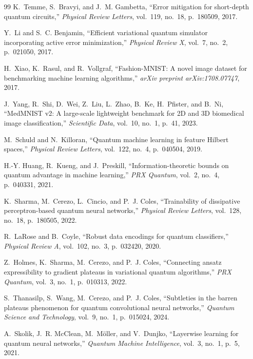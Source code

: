 \documentclass[10pt,twocolumn,twoside,a4paper]{article}
\begin{document}
\begin{thebibliography}{99}
K.~Temme, S.~Bravyi, and J.~M. Gambetta,
``Error mitigation for short-depth quantum circuits,''
\textit{Physical Review Letters}, vol.~119, no.~18, p.~180509, 2017.

Y.~Li and S.~C. Benjamin,
``Efficient variational quantum simulator incorporating active error minimization,''
\textit{Physical Review X}, vol.~7, no.~2, p.~021050, 2017.

H.~Xiao, K.~Rasul, and R.~Vollgraf,
``Fashion-MNIST: A novel image dataset for benchmarking machine learning algorithms,''
\textit{arXiv preprint arXiv:1708.07747}, 2017.

J.~Yang, R.~Shi, D.~Wei, Z.~Liu, L.~Zhao, B.~Ke, H.~Pfister, and B.~Ni,
``MedMNIST v2: A large-scale lightweight benchmark for 2D and 3D biomedical image classification,''
\textit{Scientific Data}, vol.~10, no.~1, p.~41, 2023.

M.~Schuld and N.~Killoran,
``Quantum machine learning in feature Hilbert spaces,''
\textit{Physical Review Letters}, vol.~122, no.~4, p.~040504, 2019.

H.-Y. Huang, R.~Kueng, and J.~Preskill,
``Information-theoretic bounds on quantum advantage in machine learning,''
\textit{PRX Quantum}, vol.~2, no.~4, p.~040331, 2021.

K.~Sharma, M.~Cerezo, L.~Cincio, and P.~J. Coles,
``Trainability of dissipative perceptron-based quantum neural networks,''
\textit{Physical Review Letters}, vol.~128, no.~18, p.~180505, 2022.

R.~LaRose and B.~Coyle,
``Robust data encodings for quantum classifiers,''
\textit{Physical Review A}, vol.~102, no.~3, p.~032420, 2020.

Z.~Holmes, K.~Sharma, M.~Cerezo, and P.~J. Coles,
``Connecting ansatz expressibility to gradient plateaus in variational quantum algorithms,''
\textit{PRX Quantum}, vol.~3, no.~1, p.~010313, 2022.

S.~Thanasilp, S.~Wang, M.~Cerezo, and P.~J. Coles,
``Subtleties in the barren plateaus phenomenon for quantum convolutional neural networks,''
\textit{Quantum Science and Technology}, vol.~9, no.~1, p.~015024, 2024.

A.~Skolik, J.~R. McClean, M.~M{\"o}ller, and V.~Dunjko,
``Layerwise learning for quantum neural networks,''
\textit{Quantum Machine Intelligence}, vol.~3, no.~1, p.~5, 2021.


\end{thebibliography}
\end{document}
